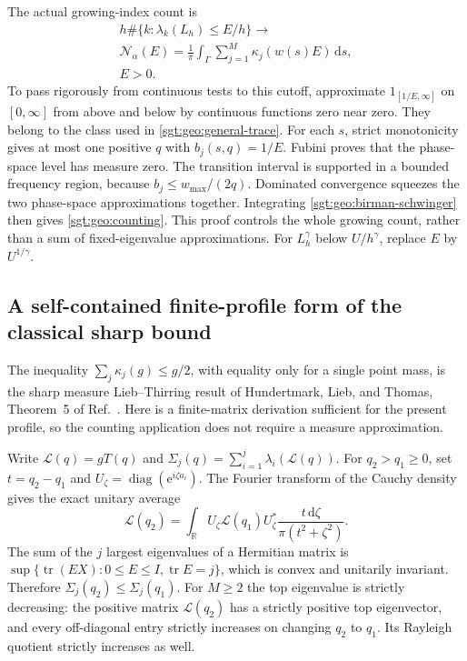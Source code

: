 \documentclass[aps,pra,reprint,superscriptaddress,longbibliography]{revtex4-2}
\newcommand{\dd}{\mathrm d}
\newcommand{\ee}{\mathrm e}
\begin{document}
The actual growing-index count is
\begin{equation}
\begin{gathered}
 h\#\{k:\lambda_k(L_h)\leq E/h\}
 \longrightarrow
\\
 \mathcal N_\alpha(E)=\frac1\pi\int_\Gamma
                    \sum_{j=1}^M\kappa_j(w(s)E)\,\dd s,
 \\
 E>0.
 \label{sgt:geo:counting}
\end{gathered}
\end{equation}
To pass rigorously from continuous tests to this cutoff, approximate
$1_{[1/E,\infty]}$ on $[0,\infty]$ from above and below by continuous
functions zero near zero.  They belong to the class used in
\eqref{sgt:geo:general-trace}.  For each $s$, strict monotonicity gives
at most one positive $q$ with $b_j(s,q)=1/E$.  Fubini proves that the
phase-space level has measure zero.  The transition interval is
supported in a bounded frequency region, because
$b_j\leq w_{\max}/(2q)$.  Dominated convergence squeezes the two
phase-space approximations together.  Integrating
\eqref{sgt:geo:birman-schwinger} then gives \eqref{sgt:geo:counting}.
This proof controls the whole growing count, rather than a sum of
fixed-eigenvalue approximations.  For $L_h^\gamma$ below $U/h^\gamma$,
replace $E$ by $U^{1/\gamma}$.

\subsection{A self-contained finite-profile form of the classical sharp bound}
\label{sgt:geo:hlt}

The inequality $\sum_j\kappa_j(g)\leq g/2$, with equality only for a
single point mass, is the sharp measure Lieb--Thirring result of
Hundertmark, Lieb, and Thomas, Theorem~5 of
Ref.~\cite{HundertmarkLiebThomas1998}.
Here is a finite-matrix derivation sufficient for the present profile,
so the counting application does not require a measure approximation.

Write $\mathcal L(q)=gT(q)$ and
$\Sigma_j(q)=\sum_{i=1}^j\lambda_i(\mathcal L(q))$.
For $q_2>q_1\geq0$, set $t=q_2-q_1$ and
$U_\zeta=\operatorname{diag}(\ee^{i\zeta a_i})$.  The Fourier transform
of the Cauchy density gives the exact unitary average
\[
 \mathcal L(q_2)=\int_{\mathbb R}U_\zeta\mathcal L(q_1)U_\zeta^*
                   \frac{t\,\dd\zeta}{\pi(t^2+\zeta^2)}.
\]
The sum of the $j$ largest eigenvalues of a Hermitian matrix is
$\sup\{\operatorname{tr}(EX):0\leq E\leq I,\operatorname{tr}E=j\}$,
which is convex and unitarily invariant.  Therefore
$\Sigma_j(q_2)\leq\Sigma_j(q_1)$.
For $M\geq2$ the top eigenvalue is strictly decreasing: the positive
matrix $\mathcal L(q_2)$ has a strictly positive top eigenvector, and
every off-diagonal entry strictly increases on changing $q_2$ to
$q_1$.  Its Rayleigh quotient strictly increases as well.
\end{document}
